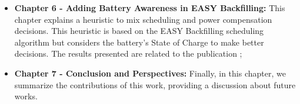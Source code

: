 \begin{itemize}
    \item[] \textbf{Chapter 6 - Adding Battery Awareness in EASY Backfilling:} This chapter explains a heuristic to mix scheduling and power compensation decisions. This heuristic is based on the EASY Backfilling scheduling algorithm but considers the battery's State of Charge to make better decisions. The results presented are related to the publication \cite{de2023adding};
    \item[] \textbf{Chapter 7 - Conclusion and Perspectives:} Finally, in this chapter, we summarize the contributions of this work, providing a discussion about future works.
\end{itemize}
